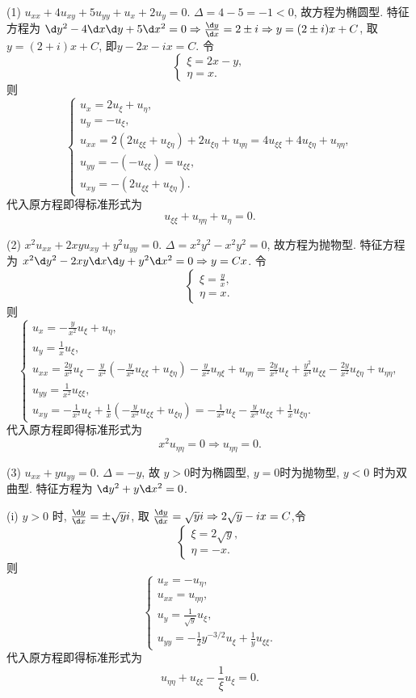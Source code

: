 \begin{solve}
  (1) $u_{xx}+4u_{xy}+5u_{yy}+u_x+2u_y=0$.
  $\Delta=4-5=-1<0$, 故方程为椭圆型.
  特征方程为 $\d y^2-4\d x\d y+5\d x^2=0\Rightarrow\frac{\d y}{\d x}=2\pm i\Rightarrow y=(2\pm i)x+C$, 取$y=(2+i)x+C$, 即$y-2x-ix=C$. 令
  \[\begin{cases}
  \xi=2x-y, \\
  \eta=x.
  \end{cases}\]
  则
  \[\begin{cases}
    u_x=2u_{\xi}+u_{\eta}, \\
    u_y=-u_{\xi}, \\
    u_{xx}=2(2u_{\xi\xi}+u_{\xi\eta})+2u_{\xi\eta}+u_{\eta\eta}=4u_{\xi\xi}+4u_{\xi\eta}+u_{\eta\eta}, \\
    u_{yy}=-(-u_{\xi\xi})=u_{\xi\xi}, \\
    u_{xy}=-(2u_{\xi\xi}+u_{\xi\eta}).
  \end{cases}\]
  代入原方程即得标准形式为
  \[u_{\xi\xi}+u_{\eta\eta}+u_{\eta} = 0.\]

  (2) $x^2u_{xx}+2xyu_{xy}+y^2u_{yy}=0$.
  $\Delta=x^2y^2-x^2y^2=0$, 故方程为抛物型.
  特征方程为 $x^2\d y^2-2xy\d x\d y+y^2\d x^2=0\Rightarrow y=Cx$. 令
  \[\begin{cases}
  \xi = \frac{y}{x}, \\
  \eta = x.
  \end{cases}\]
  则
  \[\begin{cases}
    u_x = -\frac{y}{x^2}u_{\xi}+u_{\eta}, \\
    u_y = \frac{1}{x}u_{\xi}, \\
    u_{xx} = \frac{2y}{x^3}u_{\xi}-\frac{y}{x^2}
      \left(-\frac{y}{x^2}u_{\xi\xi}+u_{\xi\eta}\right)-\frac{y}{x^2}u_{\eta\xi}+u_{\eta\eta}
      = \frac{2y}{x^3}u_{\xi}+\frac{y^2}{x^4}u_{\xi\xi}-\frac{2y}{x^2}u_{\xi\eta}+u_{\eta\eta}, \\
    u_{yy}=\frac{1}{x^2}u_{\xi\xi}, \\
    u_{xy}=-\frac{1}{x^2}u_{\xi}+\frac{1}{x}\left(-\frac{y}{x^2}u_{\xi\xi}+u_{\xi\eta}\right)
      = -\frac{1}{x^2}u_{\xi}-\frac{y}{x^3}u_{\xi\xi}+\frac{1}{x}u_{\xi\eta}.
  \end{cases}\]
  代入原方程即得标准形式为
  \[x^2u_{\eta\eta}=0\Rightarrow u_{\eta\eta} = 0.\]

  (3) $u_{xx}+yu_{yy}=0$.
  $\Delta=-y$, 故 $y>0$时为椭圆型, $y=0$时为抛物型, $y<0$ 时为双曲型.
  特征方程为 $\d y^2+y\d x^2=0$.

  (i) $y>0$ 时, $\frac{\d y}{\d x}=\pm\sqrt{y}i$,
  取 $\frac{\d y}{\d x}=\sqrt{y}i\Rightarrow 2\sqrt{y}-ix=C$,令
  \[\begin{cases}
  \xi = 2\sqrt{y}, \\
  \eta=-x.
  \end{cases}\]
  则
  \[\begin{cases}
    u_x = -u_{\eta}, \\
    u_{xx} = u_{\eta\eta}, \\
    u_{y} = \frac{1}{\sqrt{y}}u_{\xi}, \\
    u_{yy} = -\frac{1}{2}y^{-3/2}u_{\xi}+\frac{1}{y}u_{\xi\xi}.
  \end{cases}\]
  代入原方程即得标准形式为
  \[u_{\eta\eta}+u_{\xi\xi}-\frac{1}{\xi}u_{\xi} = 0.\]


\end{solve}
